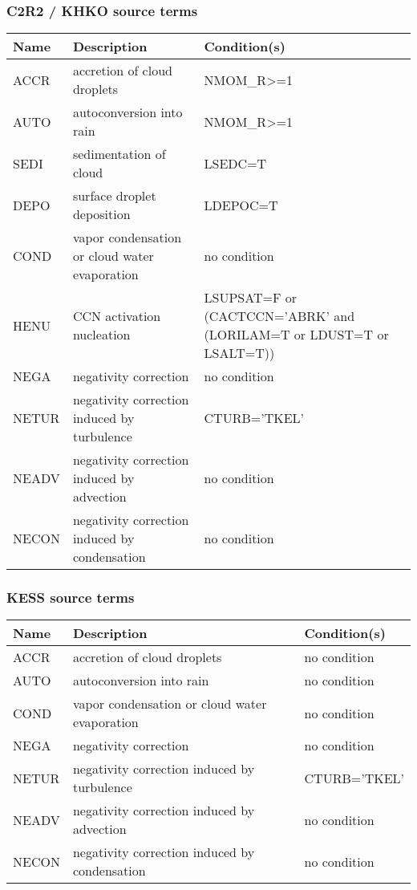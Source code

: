 \subsubsection{C2R2 / KHKO source terms}

\begin{longtable} {|p{}|p{}|p{}|}
\hline
Name & Description & Condition(s) \\
\hline \hline
\endhead
ACCR   & accretion of cloud droplets                   & NMOM\_R>=1 \\\hline
AUTO   & autoconversion into rain                      & NMOM\_R>=1 \\\hline
SEDI   & sedimentation of cloud                        & LSEDC=T \\\hline
DEPO   & surface droplet deposition                    & LDEPOC=T \\\hline
COND   & vapor condensation or cloud water evaporation & no condition \\\hline
HENU   & CCN activation nucleation                     & LSUPSAT=F or (CACTCCN='ABRK' and (LORILAM=T or LDUST=T or LSALT=T)) \\\hline
NEGA   & negativity correction                         & no condition \\\hline
NETUR  & negativity correction induced by turbulence   & CTURB='TKEL' \\\hline
NEADV  & negativity correction induced by advection    & no condition \\\hline
NECON  & negativity correction induced by condensation & no condition \\\hline
\end{longtable}

\subsubsection{KESS source terms}

\begin{longtable} {|p{}|p{}|p{}|}
\hline
Name & Description & Condition(s) \\
\hline \hline
\endhead
ACCR   & accretion of cloud droplets                   & no condition \\\hline
AUTO   & autoconversion into rain                      & no condition \\\hline
COND   & vapor condensation or cloud water evaporation & no condition \\\hline
NEGA   & negativity correction                         & no condition \\\hline
NETUR  & negativity correction induced by turbulence   & CTURB='TKEL' \\\hline
NEADV  & negativity correction induced by advection    & no condition \\\hline
NECON  & negativity correction induced by condensation & no condition \\\hline
\end{longtable}

